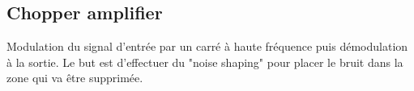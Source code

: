 \documentclass[resume]{subfiles}
\begin{document}
\begin{multicols}{3}
\subsection{Chopper amplifier}
Modulation du signal d'entrée par un carré à haute fréquence puis démodulation à la sortie. Le but est d'effectuer du "noise shaping" pour placer le bruit dans la zone qui va être supprimée.
\end{multicols}
\end{document}
